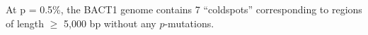 At p = 0.5\%, the BACT1 genome contains 7 ``coldspots'' corresponding to regions of length $\geq$ 5,000 bp without any $p$-mutations.
